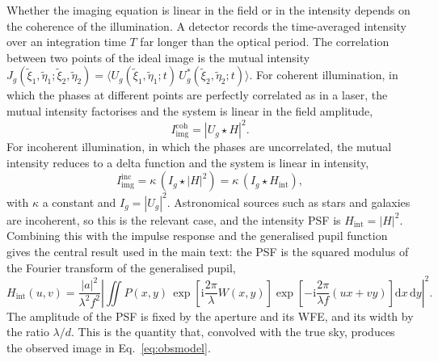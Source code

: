 \documentclass[11pt]{book}
\begin{document}
Whether the imaging equation is linear in the field or in the intensity depends on the coherence of the illumination. A detector records the time-averaged intensity over an integration time $T$ far longer than the optical period. The correlation between two points of the ideal image is the mutual intensity $J_g(\tilde\xi_1,\tilde\eta_1;\tilde\xi_2,\tilde\eta_2) = \langle U_g(\tilde\xi_1,\tilde\eta_1;t)\,U_g^{*}(\tilde\xi_2,\tilde\eta_2;t)\rangle$. For coherent illumination, in which the phases at different points are perfectly correlated as in a laser, the mutual intensity factorises and the system is linear in the field amplitude,
\begin{equation}
I_{\mathrm{img}}^{\mathrm{coh}} = |U_g\star H|^2.
\end{equation}
For incoherent illumination, in which the phases are uncorrelated, the mutual intensity reduces to a delta function and the system is linear in intensity,
\begin{equation}
I_{\mathrm{img}}^{\mathrm{inc}} = \kappa\,(I_g\star |H|^2) = \kappa\,(I_g\star H_{\mathrm{int}}),
\end{equation}
with $\kappa$ a constant and $I_g=|U_g|^2$. Astronomical sources such as stars and galaxies are incoherent, so this is the relevant case, and the intensity PSF is $H_{\mathrm{int}} = |H|^2$. Combining this with the impulse response and the generalised pupil function gives the central result used in the main text: the PSF is the squared modulus of the Fourier transform of the generalised pupil,
\begin{equation}
H_{\mathrm{int}}(u,v) = \frac{|a|^2}{\lambda^2 f^2}
\left|\iint P(x,y)\,\exp\!\left[\mathrm{i}\frac{2\pi}{\lambda}W(x,y)\right]
\exp\!\left[-\mathrm{i}\frac{2\pi}{\lambda f}(ux+vy)\right]\mathrm{d}x\,\mathrm{d}y\right|^2.
\label{eq:psf}
\end{equation}
The amplitude of the PSF is fixed by the aperture and its WFE, and its width by the ratio $\lambda/d$. This is the quantity that, convolved with the true sky, produces the observed image in Eq.~\eqref{eq:obsmodel}.
\end{document}
